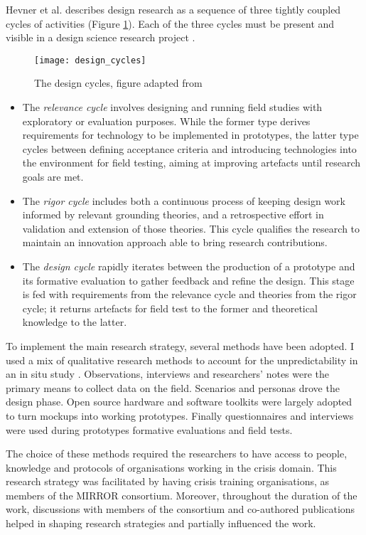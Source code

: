 Hevner et al. \autocite*{Havner2004} describes design research as a sequence of three tightly coupled cycles of activities (Figure \ref{fig:design-cycles}). Each of the three cycles must be present and visible in a design science research project \autocite{Hevner:2010gc}.
\begin{figure}
	[tbh] \centering 
	\texttt{[image: design\_cycles]} \caption{The design cycles, figure adapted from \protect\autocite{hevner2007three}} \label{fig:design-cycles} 
\end{figure}
\begin{itemize}
	\item The \emph{relevance cycle} involves designing and running field studies with exploratory or evaluation purposes. While the former type derives requirements for technology to be implemented in prototypes, the latter type cycles between defining acceptance criteria and introducing technologies into the environment for field testing, aiming at improving artefacts until research goals are met. 
	\item The \emph{rigor cycle} includes both a continuous process of keeping design work informed by relevant grounding theories, and a retrospective effort in validation and extension of those theories. This cycle qualifies the research to maintain an innovation approach able to bring research contributions. 
	\item The \emph{design cycle} rapidly iterates between the production of a prototype and its formative evaluation to gather feedback and refine the design. This stage is fed with requirements from the relevance cycle and theories from the rigor cycle; it returns artefacts for field test to the former and theoretical knowledge to the latter. 
\end{itemize}

To implement the main research strategy, several methods have been adopted. I used a mix of qualitative research methods to account for the unpredictability in an in situ study \autocite{Rogers:2007gv}. Observations, interviews and researchers' notes were the primary means to collect data on the field. Scenarios and personas drove the design phase. Open source hardware and software toolkits were largely adopted to turn mockups into working prototypes. Finally questionnaires and interviews were used during prototypes formative evaluations and field tests.

The choice of these methods required the researchers to have access to people, knowledge and protocols of organisations working in the crisis domain. This research strategy was facilitated by having crisis training organisations, as members of the MIRROR consortium. Moreover, throughout the duration of the work, discussions with members of the consortium and co-authored publications helped in shaping research strategies and partially influenced the work.

